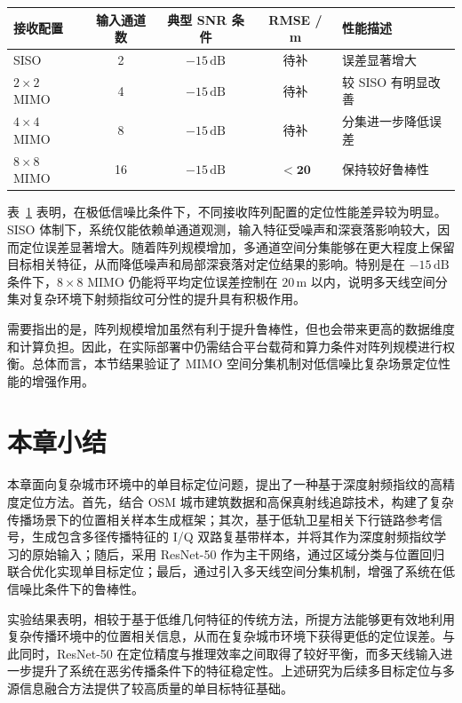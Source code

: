 \begin{table}[htbp]
    \centering
    \label{tab:mimo_comparison_ch3}
    \begin{tabular}{@{}lcccl@{}}
        \toprule
        \textbf{接收配置} & \textbf{输入通道数} & \textbf{典型 SNR 条件} & \textbf{RMSE / m} & \textbf{性能描述} \\ \midrule
        SISO & 2 & \(-15\,\mathrm{dB}\) & 待补 & 误差显著增大 \\
        \(2\times 2\) MIMO & 4 & \(-15\,\mathrm{dB}\) & 待补 & 较 SISO 有明显改善 \\
        \(4\times 4\) MIMO & 8 & \(-15\,\mathrm{dB}\) & 待补 & 分集进一步降低误差 \\
        \(8\times 8\) MIMO & 16 & \(-15\,\mathrm{dB}\) & \(\mathbf{<20}\) & 保持较好鲁棒性 \\ \bottomrule
    \end{tabular}
\end{table}

表~\ref{tab:mimo_comparison_ch3} 表明，在极低信噪比条件下，不同接收阵列配置的定位性能差异较为明显。SISO 体制下，系统仅能依赖单通道观测，输入特征受噪声和深衰落影响较大，因而定位误差显著增大。随着阵列规模增加，多通道空间分集能够在更大程度上保留目标相关特征，从而降低噪声和局部深衰落对定位结果的影响。特别是在 \(-15\,\mathrm{dB}\) 条件下，\(8\times8\) MIMO 仍能将平均定位误差控制在 \(20\,\mathrm{m}\) 以内，说明多天线空间分集对复杂环境下射频指纹可分性的提升具有积极作用。

需要指出的是，阵列规模增加虽然有利于提升鲁棒性，但也会带来更高的数据维度和计算负担。因此，在实际部署中仍需结合平台载荷和算力条件对阵列规模进行权衡。总体而言，本节结果验证了 MIMO 空间分集机制对低信噪比复杂场景定位性能的增强作用。

\section{本章小结}
\label{sec:3_7}

本章面向复杂城市环境中的单目标定位问题，提出了一种基于深度射频指纹的高精度定位方法。首先，结合 OSM 城市建筑数据和高保真射线追踪技术，构建了复杂传播场景下的位置相关样本生成框架；其次，基于低轨卫星相关下行链路参考信号，生成包含多径传播特征的 I/Q 双路复基带样本，并将其作为深度射频指纹学习的原始输入；随后，采用 ResNet-50 作为主干网络，通过区域分类与位置回归联合优化实现单目标定位；最后，通过引入多天线空间分集机制，增强了系统在低信噪比条件下的鲁棒性。

实验结果表明，相较于基于低维几何特征的传统方法，所提方法能够更有效地利用复杂传播环境中的位置相关信息，从而在复杂城市环境下获得更低的定位误差。与此同时，ResNet-50 在定位精度与推理效率之间取得了较好平衡，而多天线输入进一步提升了系统在恶劣传播条件下的特征稳定性。上述研究为后续多目标定位与多源信息融合方法提供了较高质量的单目标特征基础。
